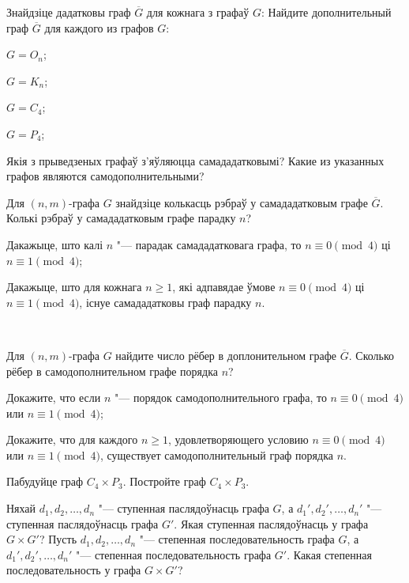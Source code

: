 \documentclass[12pt, a4paper]{article}
\begin{document}
\begin{problemList}
\smallskip

\problemItemWithCommonPartComplicated
{Знайдзіце дадатковы граф $\overline{G}$ для кожнага з графаў $G$:}
{Найдите дополнительный граф $\overline{G}$ для каждого из графов $G$:}
{%
\begin{belarusianEnumerateTwocol}
    \item $G=O_n$;
    \item $G=K_n$;
    \item $G=C_4$;
    \item $G=P_4$;
\end{belarusianEnumerateTwocol}
}
{Якія з прыведзеных графаў з'яўляюцца самададатковымі?}
{Какие из указанных графов являются самодополнительными?}

\bigskip

\problemItemSimple
{%
\begin{belarusianEnumerate}
    \item Для $(n,m)$-графа $G$ знайдзіце колькасць рэбраў у самададатковым графе $\overline{G}$.
    Колькі рэбраў у самададатковым графе парадку $n$?
    \item Дакажыце, што калі $n$ "--- парадак самададатковага графа,
    то $n\equiv 0\pmod 4$ ці $n \equiv 1 \pmod 4$;
    \item Дакажыце, што для кожнага $n\ge 1$, які адпавядае ўмове $n\equiv 0\pmod 4$
    ці $n \equiv 1 \pmod 4$, існуе самададатковы граф парадку $n$.
\end{belarusianEnumerate}\\[-30pt]
}
{%
\begin{russianEnumerate}
    \item Для $(n,m)$-графа $G$ найдите число рёбер в доплонительном графе $\overline{G}$.
    Сколько рёбер в самодополнительном графе порядка $n$?
    \item Докажите, что если $n$ "--- порядок самодополнительного графа, 
    то $n\equiv 0\pmod 4$ или $n \equiv 1 \pmod 4$;
    \item Докажите, что для каждого $n\ge 1$, удовлетворяющего условию $n\equiv 0\pmod 4$ 
    или $n \equiv 1 \pmod 4$, существует самодополнительный граф порядка $n$.
\end{russianEnumerate}
}

\bigskip

\problemItemSimple
{Пабудуйце граф $C_4\times P_3$.}
{Постройте граф $C_4\times P_3$.}

\bigskip

\problemItemSimple
{Няхай $d_1, d_2, \ldots, d_n$ "--- ступенная паслядоўнасць графа $G$,
а $d_1', d_2', \ldots, d_n'$ "--- ступенная паслядоўнасць графа $G'$.
Якая ступенная паслядоўнасць у графа $G\times G'$?}
{Пусть $d_1, d_2, \ldots, d_n$ "--- степенная последовательность графа $G$,
а $d_1', d_2', \ldots, d_n'$ "--- степенная последовательность графа $G'$.
Какая степенная последовательность у графа $G\times G'$?}


\end{problemList}
\end{document}
